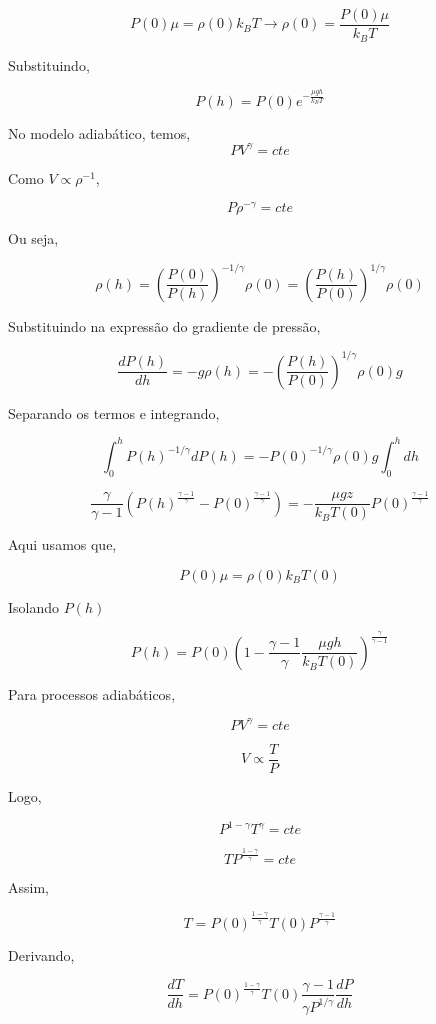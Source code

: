 \documentclass[11pt]{article}
\begin{document}
\begin{pproblem}
\begin{pssolution*}{}{}
\begin{alternativas}
        \[P(0)\mu = \rho(0)k_B T \rightarrow \rho(0) = \frac{P(0)\mu}{k_BT}\]

        Substituindo, 

        \[\boxed{P(h) = P(0)e^{-\frac{\mu g h}{k_BT}}}\]

        \item No modelo adiabático, temos, 
        \[PV^\gamma = cte\]

        Como \(V\propto \rho^{-1}\), 

        \[P\rho^{-\gamma} = cte\]

        Ou seja, 

        \[\rho(h) = \left(\frac{P(0)}{P(h)}\right)^{-1/\gamma}\rho(0) = \left(\frac{P(h)}{P(0)}\right)^{1/\gamma}\rho(0)\]

        Substituindo na expressão do gradiente de pressão, 

        \[\frac{dP(h)}{dh} = -g\rho(h) = -\left(\frac{P(h)}{P(0)}\right)^{1/\gamma}\rho(0)g\]

        Separando os termos e integrando, 

        \[\int_0^h P(h)^{-1/\gamma}dP(h) = -P(0)^{-1/\gamma}\rho(0)g\int_0^h dh\]

        \[\frac{\gamma}{\gamma-1}(P(h)^{\frac{\gamma-1}{\gamma}}-P(0)^{\frac{\gamma-1}{\gamma}}) = -\frac{\mu g z}{k_B T(0)}P(0)^{\frac{\gamma-1}{\gamma}}\]

        Aqui usamos que, 

        \[P(0)\mu = \rho(0)k_B T(0)\]

        Isolando \(P(h)\)
    
        \[\boxed{P(h) = P(0)\left(1-\frac{\gamma-1}{\gamma}\frac{\mu g h}{k_B T(0)}\right)^{\frac{\gamma}{\gamma-1}}}\]
       
        \item Para processos adiabáticos, 
        
        \[PV^\gamma = cte\]

        \[V\propto \frac{T}{P}\]

        Logo, 

        \[P^{1-\gamma} T^\gamma = cte\]

        \[T P^\frac{1-\gamma}{\gamma} = cte\]
        
        Assim, 

        \[T = P(0)^\frac{1-\gamma}{\gamma}T(0)P^{\frac{\gamma-1}{\gamma}}\]

        Derivando, 

        \[\frac{dT}{dh} = P(0)^\frac{1-\gamma}{\gamma}T(0) \frac{\gamma-1}{\gamma P^{1/\gamma}}\frac{dP}{dh}\]


\end{alternativas}
\end{pssolution*}
\end{pproblem}
\end{document}
